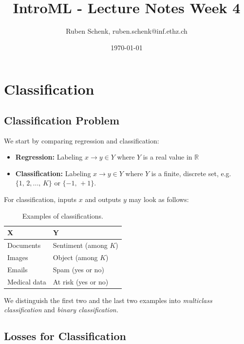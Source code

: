 \documentclass[a4paper]{extarticle}
\title{IntroML - Lecture Notes Week 4}
\author{Ruben Schenk, ruben.schenk@inf.ethz.ch}
\date{\today}
\begin{document}
\maketitle
\newpage

\section{Classification}

\subsection{Classification Problem}

We start by comparing regression and classification:

\begin{itemize}
    \item \textbf{Regression:} Labeling \(x \to y \in Y\) where \(Y\) is a real value in \(\mathbb{R}\)
    \item \textbf{Classification:} Labeling \(x \to y \in Y\) where \(Y\) is a finite, discrete set, e.g. \(\{1, \, 2,..., \, K\}\) or \(\{-1, \, +1\}\).
\end{itemize}

For classification, inputs \(x\) and outputs \(y\) may look as follows:

\begin{table}[H]
    \centering
    \begin{tabular}{|l|l|}
        \hline
        \textbf{X}   & \textbf{Y}            \\ \hline
        Documents    & Sentiment (among $K$) \\ \hline
        Images       & Object (among $K$)    \\ \hline
        Emails       & Spam (yes or no)      \\ \hline
        Medical data & At risk (yes or no)   \\ \hline
    \end{tabular}
    \caption{Examples of classifications.}
    \label{tab:tb0401-classification}
    \end{table}

We distinguish the first two and the last two examples into \textit{multiclass classification} and \textit{binary classification.}

\subsection{Losses for Classification}
\end{document}
